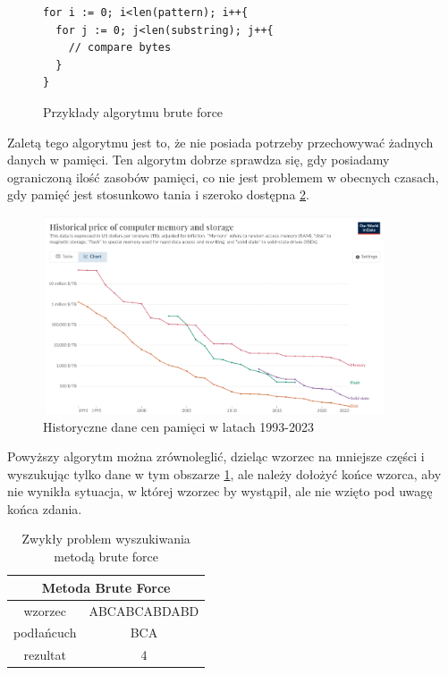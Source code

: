 \begin{figure}[h]
  \centering
  \begin{lstlisting}
for i := 0; i<len(pattern); i++{
  for j := 0; j<len(substring); j++{
    // compare bytes
  }
}
  \end{lstlisting}
  \caption{Przykłady algorytmu brute force}
  \label{fig:code:bruteForceComparison}
\end{figure}

Zaletą tego algorytmu jest to, że nie posiada potrzeby przechowywać żadnych 
danych w pamięci. Ten algorytm dobrze sprawdza się, gdy posiadamy ograniczoną 
ilość zasobów pamięci, co nie jest problemem w obecnych czasach, gdy pamięć jest
stosunkowo tania i szeroko dostępna \ref{screenshot:MemPrices}.
\begin{figure}[h]
  \centering
  \includegraphics[width=0.9\textwidth]{./images/historical-mem-price.png}
  \caption{Historyczne dane cen pamięci w latach 1993-2023 }
  \label{screenshot:MemPrices}
\end{figure}

Powyższy algorytm można zrównoleglić, dzieląc wzorzec na mniejsze części
i wyszukując tylko dane w tym obszarze \ref{tabela:NormalProblemBruteForce}, 
ale należy dołożyć końce wzorca, aby nie wynikła sytuacja, w której wzorzec by
wystąpił, ale nie wzięto pod uwagę końca zdania. 

\begin{table}
  \centering
  \begin{tabular}{ |c|c|  } 
    \hline
    \multicolumn{2}{|c|}{Metoda Brute Force} \\
    \hline
    wzorzec & ABCABCABDABD \\
    \hline
    podłańcuch & BCA \\
    \hline
    rezultat & 4 \\
    \hline
  \end{tabular}
  \caption{Zwykły problem wyszukiwania metodą brute force}
  \label{tabela:NormalProblemBruteForce}
\end{table}


